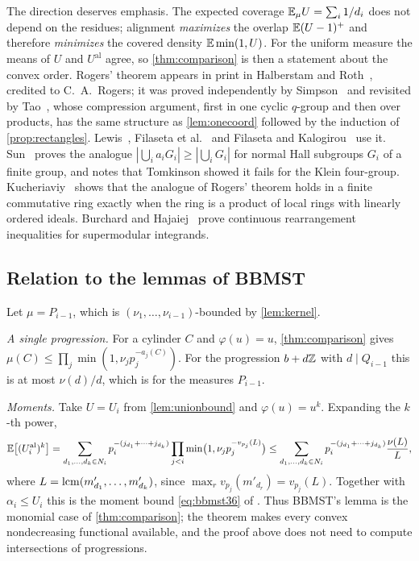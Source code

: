 The direction deserves emphasis. The expected coverage $\mathbb{E}_\mu U=\sum_i1/d_i$ does not depend on the residues;
alignment \emph{maximizes} the overlap $\mathbb{E}(U-1)^+$ and therefore \emph{minimizes} the covered density
$\mathbb{E}\min(1,U)$. For the uniform measure the means of $U$ and $U^{\mathrm{al}}$ agree, so \cref{thm:comparison}
is then a statement about the convex order. Rogers' theorem appears in print in Halberstam and
Roth~\cite[pp.~242--244]{HalberstamRoth1966}, credited to C.~A.~Rogers; it was proved independently by
Simpson~\cite[Lemma~2.3]{Simpson1986} and revisited by Tao~\cite{TaoRogers2026}, whose compression argument, first
in one cyclic $q$-group and then over products, has the same structure as \cref{lem:onecoord} followed by the
induction of \cref{prop:rectangles}. Lewis~\cite{Lewis1996}, Filaseta et al.~\cite{FFKPY2007} and Filaseta and
Kalogirou~\cite{FilasetaKalogirou2026} use it. Sun~\cite[Corollary~1.2]{Sun2006} proves the analogue
$|\bigcup_ia_iG_i|\ge|\bigcup_iG_i|$ for normal Hall subgroups $G_i$ of a finite group, and notes that Tomkinson
showed it fails for the Klein four-group. Kucheriaviy~\cite{Kucheriaviy2026} shows that the analogue of Rogers' theorem
holds in a finite commutative ring exactly when the ring is a product of local rings with linearly ordered ideals. Burchard and
Hajaiej~\cite{BurchardHajaiej2006} prove continuous rearrangement inequalities for supermodular integrands.

\subsection{Relation to the lemmas of BBMST}\label{sec:bbmst-lemmas}

Let $\mu=P_{i-1}$, which is $(\nu_1,\dots,\nu_{i-1})$-bounded by \cref{lem:kernel}.

\emph{A single progression.} For a cylinder $C$ and $\varphi(u)=u$, \cref{thm:comparison} gives
$\mu(C)\le\prod_j\min(1,\nu_jp_j^{-a_j(C)})$. For the progression $b+d\mathbb{Z}$ with $d\mid Q_{i-1}$ this is at most
$\nu(d)/d$, which is \cite[Lemma~3.4]{BBMST} for the measures $P_{i-1}$.

\emph{Moments.} Take $U=U_i$ from \cref{lem:unionbound} and $\varphi(u)=u^k$. Expanding the $k$-th power,
\[
  \mathbb{E}\bigl[(U_i^{\mathrm{al}})^k\bigr]=\sum_{d_1,\dots,d_k\in N_i}p_i^{-(j_{d_1}+\dots+j_{d_k})}
  \prod_{j<i}\min\bigl(1,\nu_jp_j^{-v_{p_j}(L)}\bigr)
  \le\sum_{d_1,\dots,d_k\in N_i}p_i^{-(j_{d_1}+\dots+j_{d_k})}\frac{\nu(L)}{L},
\]
where $L=\operatorname{lcm}(m'_{d_1},\dots,m'_{d_k})$, since $\max_rv_{p_j}(m'_{d_r})=v_{p_j}(L)$. Together with
$\alpha_i\le U_i$ this is the moment bound \eqref{eq:bbmst36} of \cite[Lemma~3.6]{BBMST}. Thus BBMST's lemma is the
monomial case of \cref{thm:comparison}; the theorem makes every convex nondecreasing functional available, and
the proof above does not need to compute intersections of progressions.


